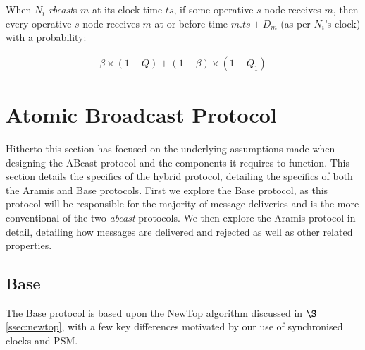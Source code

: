 When $N_i$ \emph{rbcast}s $m$ at its clock time $ts$, if some operative $s$-node receives $m$, then every operative $s$-node receives $m$ at or before time $m.ts+D_m$ (as per $N_i$'s clock) with a probability:

         \begin{equation*}
		    \begin{aligned}
		        \beta\times(1-Q)+(1-\beta)\times(1-Q_1)
		    \end{aligned}
		\end{equation*}
        

        
	    
\section{Atomic Broadcast Protocol}\label{sec:ABcast}
Hitherto this section has focused on the underlying assumptions made when designing the \textsf{ABcast} protocol and the components it requires to function.  This section details the specifics of the hybrid protocol, detailing the specifics of both the \textsf{Aramis} and \textsf{Base} protocols.  First we explore the \textsf{Base} protocol, as this protocol will be responsible for the majority of message deliveries and is the more conventional of the two \emph{abcast} protocols.  We then explore the \textsf{Aramis} protocol in detail, detailing how messages are delivered and rejected as well as other related properties.  

    \subsection{Base}
    The \textsf{Base} protocol is based upon the NewTop \citep{Ezhilchelvan:1995:NFG:876885.880005} algorithm discussed in $\S$ \ref{ssec:newtop}, with a few key differences motivated by our use of synchronised clocks and PSM.  
    
